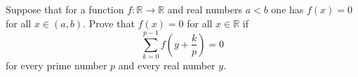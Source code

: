 Suppose that for a function $f: \mathbb{R}\to \mathbb{R}$ and real numbers $a<b$ one has $f(x)=0$ for all $x\in (a,b).$ Prove that $f(x)=0$ for all $x\in \mathbb{R}$ if
\[\sum^{p-1}_{k=0}f\left(y+\frac{k}{p}\right)=0\]
for every prime number $p$ and every real number $y.$